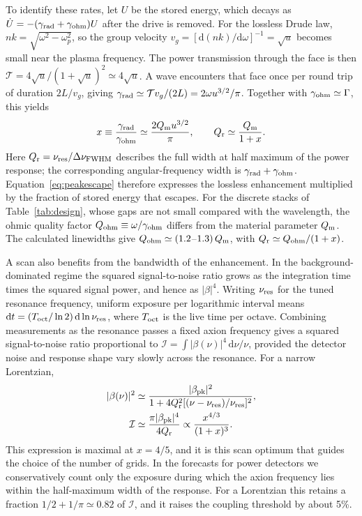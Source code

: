 \documentclass[
  aps,prl,reprint,superscriptaddress,
  amsmath,amssymb,floatfix,nofootinbib
]{revtex4-2}
\newcommand{\Qm}{Q_{\rm m}}
\newcommand{\Qr}{Q_{\rm r}}
\newcommand{\dd}{\mathrm d}
\begin{document}
To identify these rates, let $U$ be the stored energy, which decays as $\dot U=-(\gamma_{\rm rad}+\gamma_{\rm ohm})U$ after the drive is removed. For the lossless Drude law, $nk=\sqrt{\omega^2-\omega_p^2}$, so the group velocity $v_g=[\dd(nk)/\dd\omega]^{-1}=\sqrt{u}$ becomes small near the plasma frequency. The power transmission through the face is then $\mathcal T=4\sqrt{u}/(1+\sqrt{u})^2\simeq4\sqrt{u}$. A wave encounters that face once per round trip of duration $2L/v_g$, giving $\gamma_{\rm rad}\simeq\mathcal T v_g/(2L)=2\omega u^{3/2}/\pi$. Together with $\gamma_{\rm ohm}\simeq\Gamma$, this yields
\begin{equation}
x\equiv\frac{\gamma_{\rm rad}}{\gamma_{\rm ohm}}
\simeq\frac{2\Qm u^{3/2}}{\pi},
\qquad \Qr\simeq\frac{\Qm}{1+x}.
\end{equation}
Here $\Qr=\nu_{\rm res}/\Delta\nu_{\rm FWHM}$ describes the full width at half maximum of the power response; the corresponding angular-frequency width is $\gamma_{\rm rad}+\gamma_{\rm ohm}$. Equation~\eqref{eq:peakescape} therefore expresses the lossless enhancement multiplied by the fraction of stored energy that escapes. For the discrete stacks of Table~\ref{tab:design}, whose gaps are not small compared with the wavelength, the ohmic quality factor $Q_{\rm ohm}\equiv\omega/\gamma_{\rm ohm}$ differs from the material parameter $\Qm$. The calculated linewidths give $Q_{\rm ohm}\simeq(1.2$--$1.3)\,\Qm$, with $\Qr\simeq Q_{\rm ohm}/(1+x)$.

A scan also benefits from the bandwidth of the enhancement. In the background-dominated regime the squared signal-to-noise ratio grows as the integration time times the squared signal power, and hence as $|\beta|^4$. Writing $\nu_{\rm res}$ for the tuned resonance frequency, uniform exposure per logarithmic interval means $\dd t=(T_{\rm oct}/\ln2)\,\dd\ln\nu_{\rm res}$, where $T_{\rm oct}$ is the live time per octave. Combining measurements as the resonance passes a fixed axion frequency gives a squared signal-to-noise ratio proportional to $\mathcal I=\int|\beta(\nu)|^4\,\dd\nu/\nu$, provided the detector noise and response shape vary slowly across the resonance. For a narrow Lorentzian,
\begin{equation}
\begin{aligned}
|\beta(\nu)|^2&\simeq\frac{|\beta_{\rm pk}|^2}
 {1+4\Qr^2[(\nu-\nu_{\rm res})/\nu_{\rm res}]^2},\\
\mathcal I&\simeq\frac{\pi|\beta_{\rm pk}|^4}{4\Qr}
\propto\frac{x^{4/3}}{(1+x)^3}.
\end{aligned}
\end{equation}
This expression is maximal at $x=4/5$, and it is this scan optimum that guides the choice of the number of grids. In the forecasts for power detectors we conservatively count only the exposure during which the axion frequency lies within the half-maximum width of the response. For a Lorentzian this retains a fraction $1/2+1/\pi\simeq0.82$ of $\mathcal I$, and it raises the coupling threshold by about 5\%.
\end{document}
